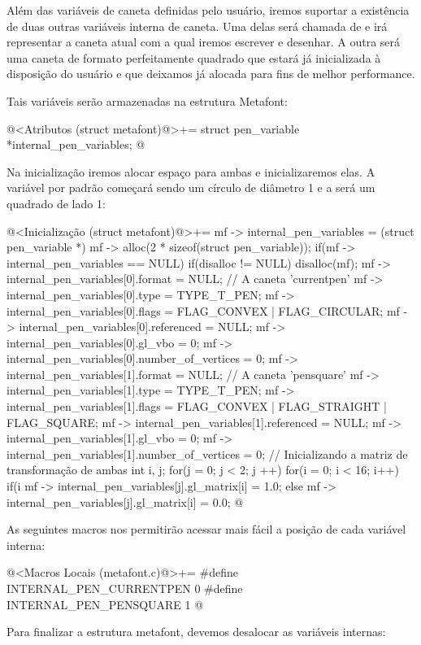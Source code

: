 Além das variáveis de caneta definidas pelo usuário, iremos suportar a
existência de duas outras variáveis interna de caneta. Uma delas será
chamada de  e irá representar a caneta atual
com a qual iremos escrever e desenhar. A outra será uma caneta de
formato perfeitamente quadrado que estará já inicializada à disposição
do usuário e que deixamos já alocada para fins de melhor performance.

Tais variáveis serão armazenadas na estrutura Metafont:

\iniciocodigo
@<Atributos (struct metafont)@>+=
struct pen_variable *internal_pen_variables;
@
\fimcodigo

Na inicialização iremos alocar espaço para ambas e inicializaremos
elas. A variável  por padrão começará sendo um
círculo de diâmetro 1 e a  será um quadrado de
lado 1:

\iniciocodigo
@<Inicialização (struct metafont)@>+=
mf -> internal_pen_variables = (struct pen_variable *)
                                 mf -> alloc(2 * sizeof(struct pen_variable));
if(mf -> internal_pen_variables == NULL){
  if(disalloc != NULL)
    disalloc(mf);
}
mf -> internal_pen_variables[0].format = NULL; // A caneta 'currentpen'
mf -> internal_pen_variables[0].type = TYPE_T_PEN;
mf -> internal_pen_variables[0].flags = FLAG_CONVEX | FLAG_CIRCULAR;
mf -> internal_pen_variables[0].referenced = NULL;
mf -> internal_pen_variables[0].gl_vbo = 0;
mf -> internal_pen_variables[0].number_of_vertices = 0;
mf -> internal_pen_variables[1].format = NULL; // A caneta 'pensquare'
mf -> internal_pen_variables[1].type = TYPE_T_PEN;
mf -> internal_pen_variables[1].flags = FLAG_CONVEX | FLAG_STRAIGHT |
                                        FLAG_SQUARE;
mf -> internal_pen_variables[1].referenced = NULL;
mf -> internal_pen_variables[1].gl_vbo = 0;
mf -> internal_pen_variables[1].number_of_vertices = 0;
{ // Inicializando a matriz de transformação de ambas
  int i, j;
  for(j = 0; j < 2; j ++)
    for(i = 0; i < 16; i++)
      if(i %
        mf -> internal_pen_variables[j].gl_matrix[i] = 1.0;
      else
        mf -> internal_pen_variables[j].gl_matrix[i] = 0.0;
}
@
\fimcodigo

As seguintes macros nos permitirão acessar mais fácil a posição de
cada variável interna:

\iniciocodigo
@<Macros Locais (metafont.c)@>+=
#define INTERNAL_PEN_CURRENTPEN 0
#define INTERNAL_PEN_PENSQUARE  1
@
\fimcodigo

Para finalizar a estrutura metafont, devemos desalocar as variáveis
internas:

